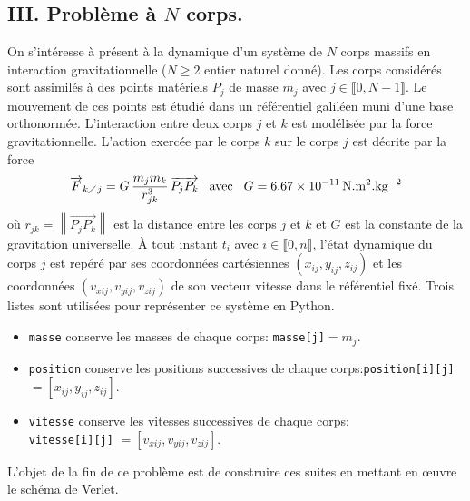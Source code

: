 \subsection*{III. Problème à $N$ corps.}
On s'intéresse à présent à la dynamique d'un système de $N$ corps massifs en interaction gravitationnelle ($N\geq 2$ entier naturel donné). Les corps considérés sont assimilés à des points matériels $P_j$ de masse $m_j$ avec $j\in \llbracket 0, N-1 \rrbracket$. Le mouvement de ces points est étudié dans un référentiel galiléen muni d'une base orthonormée. L'interaction entre deux corps $j$ et $k$ est modélisée par la force gravitationnelle. L'action exercée par le corps $k$ sur le corps $j$ est décrite par la force
\begin{displaymath}
  \overrightarrow{F}_{k\diagup j} = G\,\frac{m_j m_k}{r_{jk}^3}\, \overrightarrow{P_j P_k}\hspace{0.3cm} \text{avec} \hspace{0.3cm}
G=6.67\times 10^{-11}\,\text{N}.\text{m}^2.\text{kg}^{-2}  
\end{displaymath}
où $r_{jk} = \left\|\overrightarrow{P_j P_k}\right\|$ est la distance entre les corps $j$ et $k$ et $G$ est la constante de la gravitation universelle.\newline
\`A tout instant $t_i$ avec $i\in \llbracket 0,n \rrbracket$, l'état dynamique du corps $j$ est repéré par ses coordonnées cartésiennes $(x_{ij},y_{ij},z_{ij})$ et les coordonnées $(v_{xij},v_{yij},v_{zij})$ de son vecteur vitesse dans le référentiel fixé.\newline
Trois listes sont utilisées pour représenter ce système en Python.
\begin{itemize}
  \item \texttt{masse} conserve les masses de chaque corps: \texttt{masse[j]}$ = m_j$.
  \item \texttt{position} conserve les positions successives de chaque corps:\newline \texttt{position[i][j]} $=\left[ x_{ij}, y_{ij}, z_{ij}\right]$.
  \item \texttt{vitesse} conserve les vitesses successives de chaque corps:\\ \texttt{vitesse[i][j]} $=\left[ v_{xij}, v_{yij}, v_{zij}\right]$. 
\end{itemize}
L'objet de la fin de ce problème est de construire ces suites en mettant en \oe{}uvre le schéma de Verlet.
